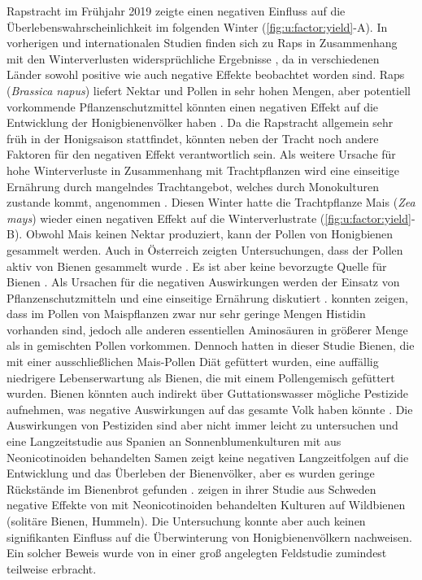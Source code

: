 Rapstracht im Frühjahr 2019 zeigte einen negativen Einfluss auf die Überlebenswahrscheinlichkeit im folgenden Winter (\cref{fig:u:factor:yield}-A). In vorherigen und internationalen Studien finden sich zu Raps in Zusammenhang mit den Winterverlusten widersprüchliche Ergebnisse \citep{vanderzee2014, gray2019, oberreiter2020}, da in verschiedenen Länder sowohl positive wie auch negative Effekte beobachtet worden sind. Raps (\textit{Brassica napus}) liefert Nektar und Pollen in sehr hohen Mengen, aber potentiell vorkommende Pflanzenschutzmittel könnten einen negativen Effekt auf die Entwicklung der Honigbienenvölker haben \citep{rundlof2015, goulson2015, rolke2016}. Da die Rapstracht allgemein sehr früh in der Honigsaison stattfindet, könnten neben der Tracht noch andere Faktoren für den negativen Effekt verantwortlich sein. Als weitere Ursache für hohe Winterverluste in Zusammenhang mit Trachtpflanzen wird eine einseitige Ernährung durch mangelndes Trachtangebot, welches durch Monokulturen zustande kommt, angenommen \citep{brodschneider2013, requieretal2017}. 
\newline
Diesen Winter hatte die Trachtpflanze Mais (\textit{Zea mays}) wieder einen negativen Effekt auf die Winterverlustrate (\cref{fig:u:factor:yield}-B). Obwohl Mais keinen Nektar produziert, kann der Pollen von Honigbienen gesammelt werden. Auch in Österreich zeigten Untersuchungen, dass der Pollen aktiv von Bienen gesammelt wurde \citep{brodschneider2019a}. Es ist aber keine bevorzugte Quelle für Bienen \citep{hocherl2012, urbanowicz2019}. Als Ursachen für die negativen Auswirkungen werden der Einsatz von Pflanzenschutzmitteln und eine einseitige Ernährung diskutiert \citep{brodschneider2013, vanderzee2014, dipasquale2016}. \cite{hocherl2012} konnten zeigen, dass im Pollen von Maispflanzen zwar nur sehr geringe Mengen Histidin vorhanden sind, jedoch alle anderen essentiellen Aminosäuren in größerer Menge als in gemischten Pollen vorkommen. Dennoch hatten in dieser Studie Bienen, die mit einer ausschließlichen Mais-Pollen Diät gefüttert wurden, eine auffällig niedrigere Lebenserwartung als Bienen, die mit einem Pollengemisch gefüttert wurden. Bienen könnten auch indirekt über Guttationswasser mögliche Pestizide aufnehmen, was negative Auswirkungen auf das gesamte Volk haben könnte \citep{schmolke2018}. Die Auswirkungen von Pestiziden sind aber nicht immer leicht zu untersuchen und eine Langzeitstudie aus Spanien an Sonnenblumenkulturen mit aus Neonicotinoiden behandelten Samen zeigt keine negativen Langzeitfolgen auf die Entwicklung und das Überleben der Bienenvölker, aber es wurden geringe Rückstände im Bienenbrot gefunden \citep{flores2020}. \cite{rundlof2015} zeigen in ihrer Studie aus Schweden negative Effekte von mit Neonicotinoiden behandelten Kulturen auf Wildbienen (solitäre Bienen, Hummeln). Die Untersuchung konnte aber auch keinen signifikanten Einfluss auf die Überwinterung von Honigbienenvölkern nachweisen. Ein solcher Beweis wurde von \cite{woodcock2017} in einer groß angelegten Feldstudie zumindest teilweise erbracht. 
